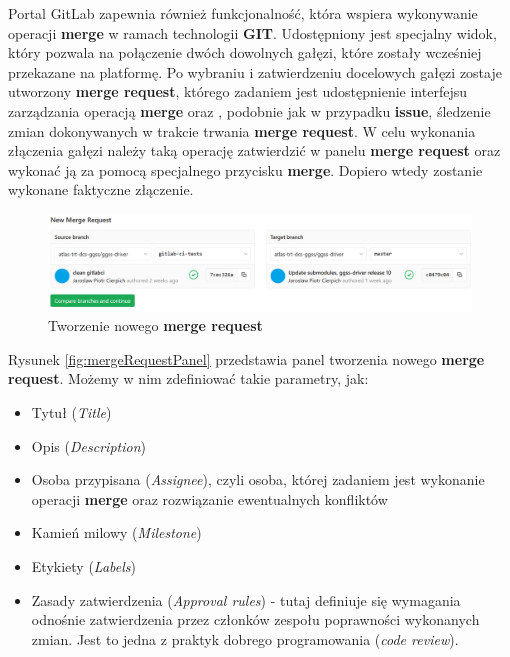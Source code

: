 Portal GitLab zapewnia również funkcjonalność, która wspiera wykonywanie operacji \textbf{merge} w ramach technologii \textbf{GIT}. Udostępniony jest specjalny widok, który pozwala na połączenie dwóch dowolnych gałęzi, które zostały wcześniej przekazane na platformę. Po wybraniu i zatwierdzeniu docelowych gałęzi zostaje utworzony \textbf{merge request}, którego zadaniem jest udostępnienie interfejsu zarządzania operacją \textbf{merge} oraz , podobnie jak w przypadku \textbf{issue}, śledzenie zmian dokonywanych w trakcie trwania \textbf{merge request}. W celu wykonania złączenia gałęzi należy taką operację zatwierdzić w panelu \textbf{merge request} oraz wykonać ją za pomocą specjalnego przycisku \textbf{merge}. Dopiero wtedy zostanie wykonane faktyczne złączenie.\par

\begin{figure}[H]
\centering
\caption{Tworzenie nowego \textbf{merge request}}
\includegraphics[width=\textwidth]{res/png/newMergeRequest}
\end{figure}

Rysunek \ref{fig:mergeRequestPanel} przedstawia panel tworzenia nowego \textbf{merge request}. Możemy w nim zdefiniować takie parametry, jak:
\begin{itemize}
\item Tytuł (\textit{Title})
\item Opis (\textit{Description})
\item Osoba przypisana (\textit{Assignee}), czyli osoba, której zadaniem jest wykonanie operacji \textbf{merge} oraz rozwiązanie ewentualnych konfliktów
\item Kamień milowy (\textit{Milestone})
\item Etykiety (\textit{Labels})
\item Zasady zatwierdzenia (\textit{Approval rules}) - tutaj definiuje się wymagania odnośnie zatwierdzenia przez członków zespołu poprawności wykonanych zmian. Jest to jedna z praktyk dobrego programowania (\textit{code review}).
\end{itemize}

